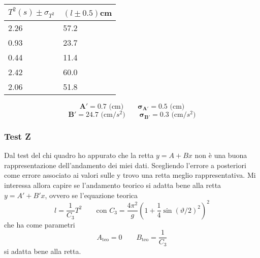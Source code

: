 \documentclass{article}
\begin{document}
	\begin{minipage}{0.3\textwidth}
		\begin{table}[H]
			\centering
			\begin{tabular}{@{}ll@{}}
				$T^2(s) \pm \sigma_{T^2}$ & \multicolumn{1}{l}{$(l \pm 0.5)$cm} \\ \midrule
				2.26&57.2    \\
				0.93&23.7    \\
				0.44&11.4    \\
				2.42&60.0    \\
				2.06&51.8    \\	\bottomrule
			\end{tabular}
		\end{table}	
		\[
		\mathbf{A'} = 0.7 \text{ (cm)} \qquad \mathbf{\sigma_{A'}} = 0.5 \text{ (cm)} 
		\]
		\[
		\mathbf{B'} = 24.7 \text{ (cm}/s^2) \qquad \mathbf{\sigma_{B'}} = 0.3 \text{ (cm}/s^2)
		\]
	\end{minipage}
	\begin{minipage}{0.3\textwidth}
		\begin{figure}[H]
			\hspace{1cm}
		\end{figure}
	\end{minipage}
	
	
	\subsubsection{Test Z}
	Dal test del chi quadro ho appurato che la retta $y = A + Bx$ non è una buona rappresentazione dell'andamento dei miei dati. Scegliendo l'errore a posteriori come errore associato ai valori sulle y trovo una retta meglio rappresentativa. Mi interessa allora capire se l'andamento teorico si adatta bene alla retta $y = A' + B'x$, ovvero se l'equazione teorica
	\[
	l = \frac{1}{C_3} T^2 \qquad \text{con } C_3 =  \frac{4 \pi^2}{g} \left( 1 + \frac{1}{4}\sin{\left(\vartheta/2\right)}^2 \right)^2
	\]
	che ha come parametri
	\[
	A_\text{teo} = 0 \qquad B_\text{teo} =  \frac{1}{C_3}
	\]
	si adatta bene alla retta. 
	
\end{document}
